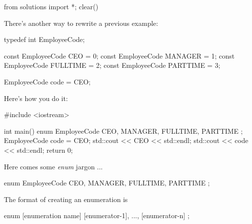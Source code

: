 \begin{python0}
from solutions import *; clear()
\end{python0}

There's another way to rewrite a previous example:

\begin{consolethree}[escapeinside=||]
typedef int EmployeeCode;

const EmployeeCode CEO = 0;
const EmployeeCode MANAGER = 1;
const EmployeeCode FULLTIME = 2;
const EmployeeCode PARTTIME = 3;

EmployeeCode code = CEO;
\end{consolethree}

Here's how you do it:

\begin{consolethree}[escapeinside=||]
#include <iostream>

int main()
{
    enum EmployeeCode
    {
        CEO, MANAGER, FULLTIME, PARTTIME
    };
    EmployeeCode code = CEO;
    std::cout << CEO << std::endl;
    std::cout << code << std::endl;
    return 0;
}
\end{consolethree}

Here comes some \textit{enum} jargon ...

\begin{consolethree}[escapeinside=||]
enum EmployeeCode
{
    CEO, MANAGER, FULLTIME, PARTTIME
};
\end{consolethree}

The format of creating an enumeration is

\begin{consolethree}[escapeinside=||]
enum [enumeration name]
{
    [enumerator-1], ...,
    [enumerator-n]
};
\end{consolethree}



